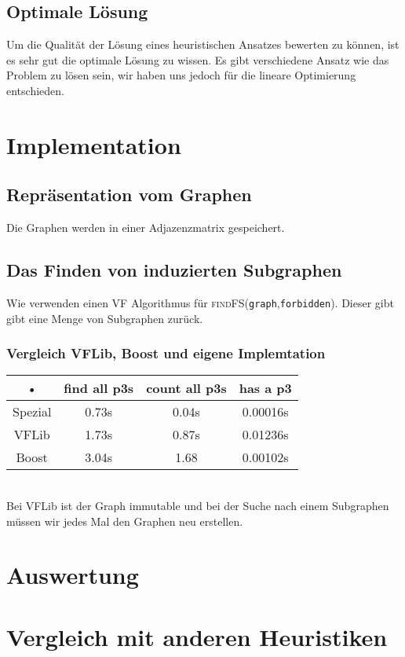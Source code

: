 \documentclass[12pt,a4paper,onecolumn,oneside,titlepage]{article}
\newcommand{\vars}{\texttt}
\newcommand{\func}{\textsc}
\begin{document}
\subsection{Optimale Lösung}
Um die Qualität der Lösung eines heuristischen Ansatzes bewerten zu können, ist es sehr gut die optimale Lösung zu wissen. Es gibt verschiedene Ansatz wie das Problem zu lösen sein, wir haben uns jedoch für die lineare Optimierung entschieden. 

\section{Implementation}
\label{sec:implementation}
\subsection{Repräsentation vom Graphen}
Die Graphen werden in einer Adjazenzmatrix gespeichert.


\subsection{Das Finden von induzierten Subgraphen}
\cite{Ullmann76}
Wie verwenden einen VF Algorithmus für \func{findFS}(\vars{graph},\vars{forbidden}).
Dieser gibt gibt eine Menge von Subgraphen zurück.

\subsubsection{Vergleich VFLib, Boost und eigene Implemtation}
\begin{tabular}{|c|c|c|c|}
\hline 
• & find all p3s & count all p3s & has a p3 \\ 
\hline 
Spezial & 0.73s & 0.04s & 0.00016s \\ 
\hline 
VFLib & 1.73s & 0.87s & 0.01236s \\ 
\hline 
Boost & 3.04s & 1.68 & 0.00102s \\ 
\hline 
\end{tabular} 
\\

Bei VFLib ist der Graph immutable und bei der Suche nach einem  Subgraphen müssen wir jedes Mal den Graphen neu erstellen.


\section{Auswertung}
\label{sec:results}

\section{Vergleich mit anderen Heuristiken}
\label{sec:compare}
\end{document}
